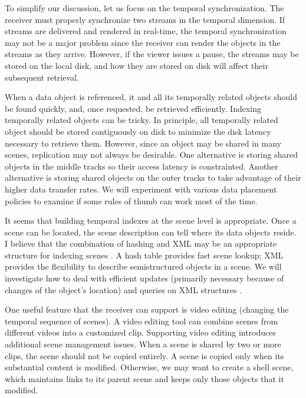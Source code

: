To simplify our discussion,
let us focus on the temporal synchronization.
The receiver must properly synchronize two streams in the temporal
dimension.  If streams are delivered and
rendered in real-time, the temporal synchronization may not be
a major problem since the receiver can render the objects in
the streams as they arrive. However, if the viewer issues a 
pause, the streams may be stored on the local disk, and how 
they are stored on disk will affect their subsequent
retrieval. 

When a data object
is referenced, it and all its temporally related objects should be
found quickly, and, once requested, be retrieved efficiently.
Indexing temporally related objects can be tricky.
In principle, all temporally related object should be
stored contiguously on disk to minimize the disk latency
necessary to retrieve them.
However, since an object may be shared in many scenes,
replication may not always be desirable. One alternative is
storing shared objects in the middle tracks so their
access latency is constrainted. Another alternative
is storing shared objects on the outer tracks to take
advantage of their higher data transfer rates.
We will experiment with various data placement policies to
examine if some rules of thumb can work most of the time.

It seems that building temporal indexes at the scene level is
appropriate. Once a scene can be located, the
scene description can tell where its data objects
reside. I believe that the combination of hashing and XML
may be an appropriate structure for indexing scenes \cite{PBC99}.
A hash table provides fast scene lookup; XML
provides the flexibility to describe semistructured
objects in a scene. We will investigate how to
deal with efficient updates (primarily necessary because of changes
of the object's location)
and queries on XML structures \cite{Abi97,Bun97,MW99}.

One useful feature that the receiver can support is video
editing (changing the temporal sequence of 
scenes). A video editing tool can combine scenes from
different videos into a customized clip. Supporting
video editing introduces additional scene management issues.
When a scene is shared by two or more clips, the scene
should not be copied entirely. A scene is copied only
when its substantial content is modified. Otherwise,
we may want to create a shell scene, which maintains
links to its parent scene and keeps only those objects that it
modified.
              
